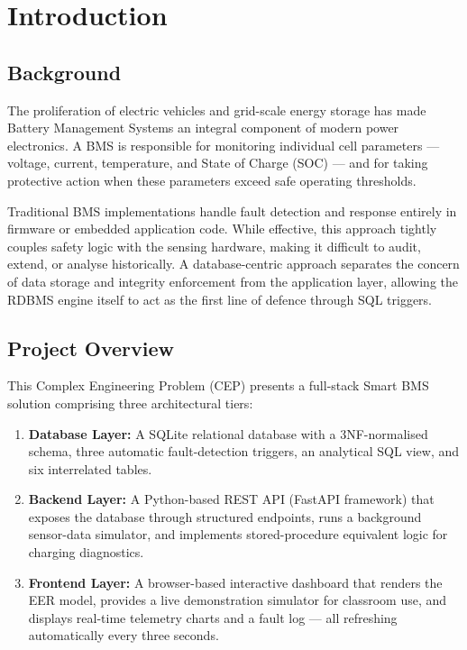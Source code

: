\documentclass[12pt, a4paper]{report}
\begin{document}
\newpage

\chapter{Introduction}

\section{Background}
The proliferation of electric vehicles and grid-scale energy storage has made Battery Management Systems an integral component of modern power electronics. A BMS is responsible for monitoring individual cell parameters — voltage, current, temperature, and State of Charge (SOC) — and for taking protective action when these parameters exceed safe operating thresholds.

Traditional BMS implementations handle fault detection and response entirely in firmware or embedded application code. While effective, this approach tightly couples safety logic with the sensing hardware, making it difficult to audit, extend, or analyse historically. A database-centric approach separates the concern of data storage and integrity enforcement from the application layer, allowing the RDBMS engine itself to act as the first line of defence through SQL triggers.

\section{Project Overview}
This Complex Engineering Problem (CEP) presents a full-stack Smart BMS solution comprising three architectural tiers:

\begin{enumerate}[label=\textbf{\arabic*.}]
    \item \textbf{Database Layer:} A SQLite relational database with a 3NF-normalised schema, three automatic fault-detection triggers, an analytical SQL view, and six interrelated tables.
    \item \textbf{Backend Layer:} A Python-based REST API (FastAPI framework) that exposes the database through structured endpoints, runs a background sensor-data simulator, and implements stored-procedure equivalent logic for charging diagnostics.
    \item \textbf{Frontend Layer:} A browser-based interactive dashboard that renders the EER model, provides a live demonstration simulator for classroom use, and displays real-time telemetry charts and a fault log — all refreshing automatically every three seconds.
\end{enumerate}
\end{document}
